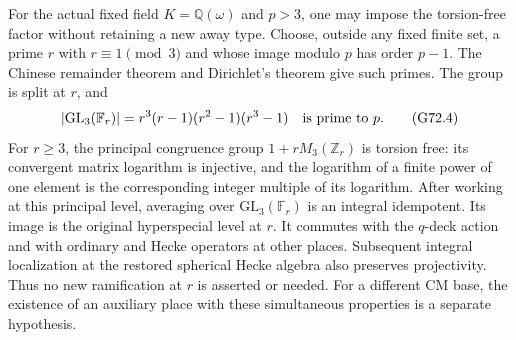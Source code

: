 \begin{remark}
For the actual fixed field \(K=\mathbb Q(\omega)\) and \(p>3\),
one may impose the torsion-free factor without retaining a new
away type.  Choose, outside any fixed finite set, a prime \(r\)
with \(r\equiv1\pmod3\) and whose image modulo \(p\) has
order \(p-1\).  The Chinese remainder theorem and Dirichlet's
theorem give such primes.  The group is split at \(r\), and
\[
 |\mathrm{GL}_3(\mathbb F_r)|
       =r^3(r-1)(r^2-1)(r^3-1)
       \quad\hbox{is prime to }p.
 \tag{G72.4}
\]
For \(r\ge3\), the principal congruence group
\(1+rM_3(\mathbb Z_r)\) is torsion free: its convergent
matrix logarithm is injective, and the logarithm of a finite power
of one element is the corresponding integer multiple of its
logarithm.  After working at this principal level, averaging over
\(\mathrm{GL}_3(\mathbb F_r)\) is an integral idempotent.
Its image is the original hyperspecial level at \(r\).
It commutes with the \(q\)-deck action and with ordinary and
Hecke operators at other places.  Subsequent integral localization
at the restored spherical Hecke algebra also preserves
projectivity.  Thus no new ramification at \(r\) is asserted or
needed.  For a different CM base, the existence of an auxiliary
place with these simultaneous properties is a separate hypothesis.
\end{remark}

